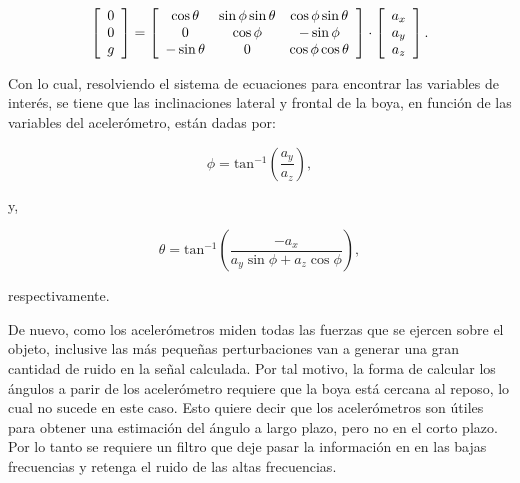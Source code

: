\documentclass[11pt]{article}
\begin{document}
\begin{equation}
  \left[
    \begin{array}{c}
      0 \\ 0 \\ g
    \end{array}
  \right] =
  \left[
    \begin{array}{c c c}
      \cos{\theta}  & \sin{\phi}\sin{\theta} &  \cos{\phi}\sin{\theta} \\
      0             & \cos{\phi}             & -\sin{\phi}             \\
      -\sin{\theta} & 0                      & \cos{\phi}\cos{\theta}  \\
    \end{array}
  \right] \cdot
  \left[
    \begin{array}{c}
      a_x \\ a_y \\ a_z
    \end{array}
  \right].
\end{equation}

Con lo cual, resolviendo el sistema de ecuaciones para encontrar las variables
de interés, se tiene que las inclinaciones lateral y frontal de la boya, en
función de las variables del acelerómetro, están dadas por:

\begin{equation}
  \phi = \mathrm{tan^{-1}} \left( \frac{a_y}{a_z} \right),
\end{equation}

y,

\begin{equation}
  \theta = \mathrm{tan^{-1}} \left( \frac{-a_x}{a_y \sin\phi + a_z \cos\phi}
  \right),
\end{equation}

respectivamente.


De nuevo, como los acelerómetros miden todas las fuerzas que se ejercen sobre el
objeto, inclusive las más pequeñas perturbaciones van a generar una gran
cantidad de ruido en la señal calculada. Por tal motivo, la forma de calcular
los ángulos a parir de los acelerómetro requiere que la boya está cercana al
reposo, lo cual no sucede en este caso. Esto quiere decir que los acelerómetros
son útiles para obtener una estimación del ángulo a largo plazo, pero no en el
corto plazo. Por lo tanto se requiere un filtro que deje pasar la información en
en las bajas frecuencias y retenga el ruido de las altas frecuencias.
\end{document}
